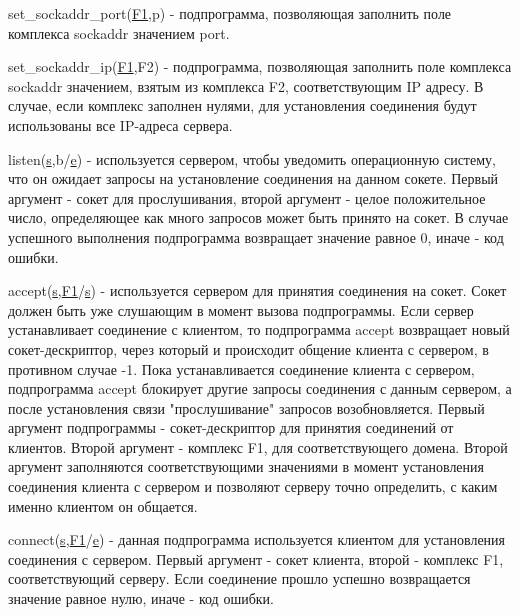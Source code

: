 \documentclass[12t,english,russian]{article}
\begin{document}
\label{set_sockaddr_port}
set\_sockaddr\_port(\hyperref[sockaddr]{F1},p) - подпрограмма, позволяющая заполнить поле комплекса sockaddr значением port.

\label{set_sockaddr_ip}
set\_sockaddr\_ip(\hyperref[sockaddr]{F1},F2) - подпрограмма, позволяющая заполнить поле комплекса sockaddr значением, взятым из комплекса F2, соответствующим IP адресу. В случае, если комплекс заполнен нулями, для установления соединения будут использованы все IP-адреса сервера.

\label{listen}
listen(\hyperref[socket]{s},b/\hyperref[error]{e}) - используется сервером, чтобы уведомить операционную систему, что он ожидает запросы на установление соединения на данном сокете. Первый аргумент - сокет для прослушивания, второй аргумент - целое положительное число, определяющее как много запросов может быть принято на сокет. В случае успешного выполнения подпрограмма возвращает значение равное 0, иначе - код ошибки.

\label{accept}
accept(\hyperref[socket]{s},\hyperref[sockaddr]{F1}/\hyperref[socket]{s}) - используется сервером для принятия соединения на сокет. Сокет должен быть уже слушающим в момент вызова подпрограммы. Если сервер устанавливает соединение с клиентом, то подпрограмма accept возвращает новый сокет-дескриптор, через который и происходит общение клиента с сервером, в противном случае -1. Пока устанавливается соединение клиента с сервером, подпрограмма accept блокирует другие запросы соединения с данным сервером, а после установления связи "прослушивание" запросов возобновляется. Первый аргумент подпрограммы - сокет-дескриптор для принятия соединений от клиентов. Второй аргумент - комплекс F1, для соответствующего домена. Второй аргумент заполняются соответствующими значениями в момент установления соединения клиента с сервером и позволяют серверу точно определить, с каким именно клиентом он общается.

\label{connect}
connect(\hyperref[socket]{s},\hyperref[sockaddr]{F1}/\hyperref[error]{e}) - данная подпрограмма используется клиентом для установления соединения с сервером. Первый аргумент - сокет клиента, второй - комплекс F1, соответствующий серверу. Если соединение прошло успешно возвращается значение равное нулю, иначе - код ошибки.
\end{document}
